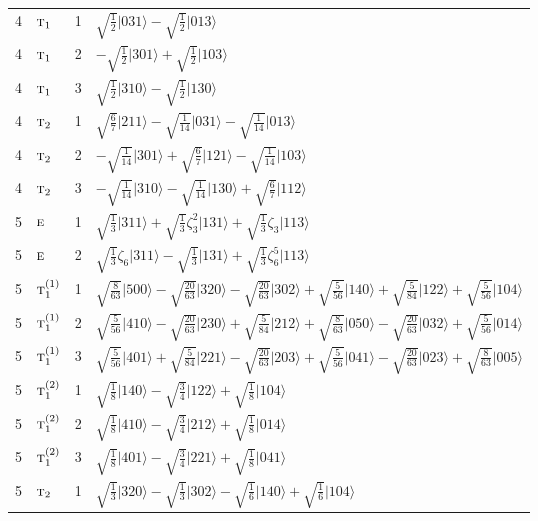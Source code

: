\documentclass[11pt]{article}
\newcommand{\irr}[1]{\text{\normalfont\scshape #1}}
\newcommand{\rootunity}[1]{\zeta_{#1}}
\newcommand{\occ}[1]{\lvert #1\rangle}
\begin{document}
\begin{longtable}{c l c p{}}
4 & $\irr{t}_{1}$ & 1 & $\sqrt{\tfrac{1}{2}}\occ{031}-\sqrt{\tfrac{1}{2}}\occ{013}$\\
4 & $\irr{t}_{1}$ & 2 & $-\sqrt{\tfrac{1}{2}}\occ{301}+\sqrt{\tfrac{1}{2}}\occ{103}$\\
4 & $\irr{t}_{1}$ & 3 & $\sqrt{\tfrac{1}{2}}\occ{310}-\sqrt{\tfrac{1}{2}}\occ{130}$\\
4 & $\irr{t}_{2}$ & 1 & $\sqrt{\tfrac{6}{7}}\occ{211}-\sqrt{\tfrac{1}{14}}\occ{031}-\sqrt{\tfrac{1}{14}}\occ{013}$\\
4 & $\irr{t}_{2}$ & 2 & $-\sqrt{\tfrac{1}{14}}\occ{301}+\sqrt{\tfrac{6}{7}}\occ{121}-\sqrt{\tfrac{1}{14}}\occ{103}$\\
4 & $\irr{t}_{2}$ & 3 & $-\sqrt{\tfrac{1}{14}}\occ{310}-\sqrt{\tfrac{1}{14}}\occ{130}+\sqrt{\tfrac{6}{7}}\occ{112}$\\
\hline
5 & $\irr{e}$ & 1 & $\sqrt{\tfrac{1}{3}}\occ{311}+\sqrt{\tfrac{1}{3}}\rootunity{3}^{2}\occ{131}+\sqrt{\tfrac{1}{3}}\rootunity{3}\occ{113}$\\
5 & $\irr{e}$ & 2 & $\sqrt{\tfrac{1}{3}}\rootunity{6}\occ{311}-\sqrt{\tfrac{1}{3}}\occ{131}+\sqrt{\tfrac{1}{3}}\rootunity{6}^{5}\occ{113}$\\
5 & $\irr{t}_{1}^{(1)}$ & 1 & $\sqrt{\tfrac{8}{63}}\occ{500}-\sqrt{\tfrac{20}{63}}\occ{320}-\sqrt{\tfrac{20}{63}}\occ{302}+\sqrt{\tfrac{5}{56}}\occ{140}+\sqrt{\tfrac{5}{84}}\occ{122}+\sqrt{\tfrac{5}{56}}\occ{104}$\\
5 & $\irr{t}_{1}^{(1)}$ & 2 & $\sqrt{\tfrac{5}{56}}\occ{410}-\sqrt{\tfrac{20}{63}}\occ{230}+\sqrt{\tfrac{5}{84}}\occ{212}+\sqrt{\tfrac{8}{63}}\occ{050}-\sqrt{\tfrac{20}{63}}\occ{032}+\sqrt{\tfrac{5}{56}}\occ{014}$\\
5 & $\irr{t}_{1}^{(1)}$ & 3 & $\sqrt{\tfrac{5}{56}}\occ{401}+\sqrt{\tfrac{5}{84}}\occ{221}-\sqrt{\tfrac{20}{63}}\occ{203}+\sqrt{\tfrac{5}{56}}\occ{041}-\sqrt{\tfrac{20}{63}}\occ{023}+\sqrt{\tfrac{8}{63}}\occ{005}$\\
5 & $\irr{t}_{1}^{(2)}$ & 1 & $\sqrt{\tfrac{1}{8}}\occ{140}-\sqrt{\tfrac{3}{4}}\occ{122}+\sqrt{\tfrac{1}{8}}\occ{104}$\\
5 & $\irr{t}_{1}^{(2)}$ & 2 & $\sqrt{\tfrac{1}{8}}\occ{410}-\sqrt{\tfrac{3}{4}}\occ{212}+\sqrt{\tfrac{1}{8}}\occ{014}$\\
5 & $\irr{t}_{1}^{(2)}$ & 3 & $\sqrt{\tfrac{1}{8}}\occ{401}-\sqrt{\tfrac{3}{4}}\occ{221}+\sqrt{\tfrac{1}{8}}\occ{041}$\\
5 & $\irr{t}_{2}$ & 1 & $\sqrt{\tfrac{1}{3}}\occ{320}-\sqrt{\tfrac{1}{3}}\occ{302}-\sqrt{\tfrac{1}{6}}\occ{140}+\sqrt{\tfrac{1}{6}}\occ{104}$\\

\end{longtable}
\end{document}
